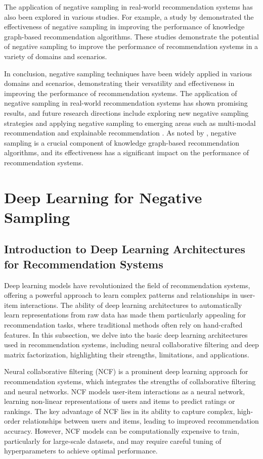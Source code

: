 \documentclass[11pt,a4paper]{article}
\begin{document}
The application of negative sampling in real-world recommendation systems has also been explored in various studies. For example, a study by \cite{doi:10.1016/j.patrec.2022.04.001} demonstrated the effectiveness of negative sampling in improving the performance of knowledge graph-based recommendation algorithms. These studies demonstrate the potential of negative sampling to improve the performance of recommendation systems in a variety of domains and scenarios.

In conclusion, negative sampling techniques have been widely applied in various domains and scenarios, demonstrating their versatility and effectiveness in improving the performance of recommendation systems. The application of negative sampling in real-world recommendation systems has shown promising results, and future research directions include exploring new negative sampling strategies and applying negative sampling to emerging areas such as multi-modal recommendation and explainable recommendation \cite{arxiv:2206.04415}. As noted by \cite{arxiv:2402.19195}, negative sampling is a crucial component of knowledge graph-based recommendation algorithms, and its effectiveness has a significant impact on the performance of recommendation systems.


\section{Deep Learning for Negative Sampling}



\subsection{Introduction to Deep Learning Architectures for Recommendation Systems}


Deep learning models have revolutionized the field of recommendation systems, offering a powerful approach to learn complex patterns and relationships in user-item interactions. The ability of deep learning architectures to automatically learn representations from raw data has made them particularly appealing for recommendation tasks, where traditional methods often rely on hand-crafted features. In this subsection, we delve into the basic deep learning architectures used in recommendation systems, including neural collaborative filtering and deep matrix factorization, highlighting their strengths, limitations, and applications.

Neural collaborative filtering (NCF) \cite{doi:10.1145/2983323.2983874} is a prominent deep learning approach for recommendation systems, which integrates the strengths of collaborative filtering and neural networks. NCF models user-item interactions as a neural network, learning non-linear representations of users and items to predict ratings or rankings. The key advantage of NCF lies in its ability to capture complex, high-order relationships between users and items, leading to improved recommendation accuracy. However, NCF models can be computationally expensive to train, particularly for large-scale datasets, and may require careful tuning of hyperparameters to achieve optimal performance.
\end{document}
